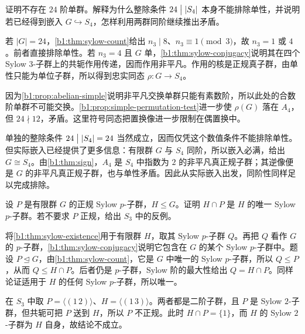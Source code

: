 \begin{exercise}\label{b1:ex:05-5}
	证明不存在 \(24\) 阶单群。解释为什么整除条件 \(24\bigm\vert|S_4|\) 本身不能排除单性，并说明若已经得到嵌入 \(G\hookrightarrow S_4\)，怎样利用两群同阶继续推出矛盾。
\end{exercise}
\begin{solution}
	若 \(|G|=24\)，\cref{b1:thm:sylow-count}给出 \(n_3\mid8\)、\(n_3\equiv1\pmod3\)，故 \(n_3=1\) 或 \(4\)。前者直接排除单性。若 \(n_3=4\) 且 \(G\) 单，\cref{b1:thm:sylow-conjugacy}说明其在四个 Sylow \(3\)-子群上的共轭作用传递，因而作用非平凡。作用的核是正规真子群，由单性只能为单位子群，所以得到忠实同态 \(\rho:G\rightarrow S_4\)。

	因为\cref{b1:prop:abelian-simple}说明非平凡交换单群只能有素数阶，所以此处的合数阶单群不可能交换。\cref{b1:prop:simple-permutation-test}进一步使 \(\rho(G)\) 落在 \(A_4\)，但 \(24\nmid12\)，矛盾。这里符号同态把置换像进一步限制在偶置换中。

	单独的整除条件 \(24\bigm\vert|S_4|=24\) 当然成立，因而仅凭这个数值条件不能排除单性。但实际嵌入已经提供了更多信息：有限群 \(G\) 与 \(S_4\) 同阶，所以嵌入必满，给出 \(G\cong S_4\)。由\cref{b1:thm:sign}，\(A_4\) 是 \(S_4\) 中指数为 \(2\) 的非平凡真正规子群；其逆像便是 \(G\) 的非平凡真正规子群，也与单性矛盾。因此从实际嵌入出发，同阶性同样足以完成排除。
\end{solution}

\begin{exercise}\label{b1:ex:05-6}
	设 \(P\) 是有限群 \(G\) 的正规 Sylow \(p\)-子群，\(H\leq G\)。证明 \(H\cap P\) 是 \(H\) 的唯一 Sylow \(p\)-子群。若不要求 \(P\) 正规，给出 \(S_3\) 中的反例。
\end{exercise}
\begin{solution}
	将\cref{b1:thm:sylow-existence}用于有限群 \(H\)，取其 Sylow \(p\)-子群 \(Q\)。再把 \(Q\) 看作 \(G\) 的 \(p\)-子群，\cref{b1:thm:sylow-conjugacy}说明它包含在 \(G\) 的某个 Sylow \(p\)-子群中。题设 \(P\trianglelefteq G\)，由\cref{b1:thm:sylow-count}，它是 \(G\) 中唯一的 Sylow \(p\)-子群，所以 \(Q\leq P\)，从而 \(Q\leq H\cap P\)。后者仍是 \(p\)-子群，Sylow 阶的最大性给出 \(Q=H\cap P\)。同样论证适用于 \(H\) 的任何 Sylow \(p\)-子群，所以唯一。

	在 \(S_3\) 中取 \(P=\bigl\langle(1\,2)\bigr\rangle\)、\(H=\bigl\langle(1\,3)\bigr\rangle\)。两者都是二阶子群，且 \(P\) 是 Sylow \(2\)-子群，但共轭可把 \(P\) 送到 \(H\)，所以 \(P\) 不正规。此时 \(H\cap P=\{1\}\)，而 \(H\) 的 Sylow \(2\)-子群为 \(H\) 自身，故结论不成立。
\end{solution}

